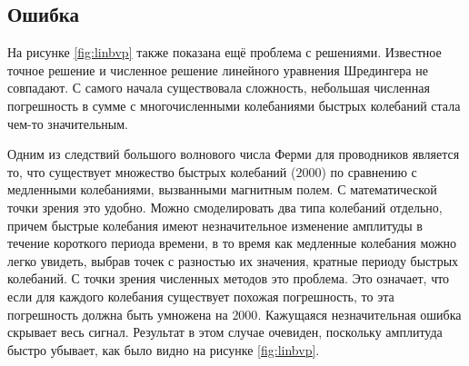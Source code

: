 \documentclass[A4,12pt,oneside]{article}
\renewcommand{\(}{\left(}
\renewcommand{\)}{\right)}
\begin{document}
\subsection{Ошибка}
На рисунке \ref{fig:linbvp} также показана ещё проблема с решениями. Известное точное решение и численное решение линейного уравнения Шредингера не совпадают. 
С самого начала существовала сложность, небольшая численная погрешность в сумме с многочисленными колебаниями быстрых колебаний стала чем-то значительным.


Одним из следствий большого волнового числа Ферми для проводников является то, что существует множество быстрых колебаний ($2000$) по сравнению с медленными колебаниями, вызванными магнитным полем. С математической точки зрения это удобно. Можно смоделировать два типа колебаний отдельно, причем быстрые колебания имеют незначительное изменение амплитуды в течение короткого периода времени, в то время как медленные колебания можно легко увидеть, выбрав точек с разностью их значения, кратные периоду быстрых колебаний. С точки зрения численных методов это проблема. Это означает, что если для каждого колебания существует похожая погрешность, то эта погрешность должна быть умножена на $2000$. Кажущаяся незначительная ошибка скрывает весь сигнал. Результат в этом случае очевиден, поскольку амплитуда быстро убывает, как было видно на рисунке \ref{fig:linbvp}.
 
\end{document}
